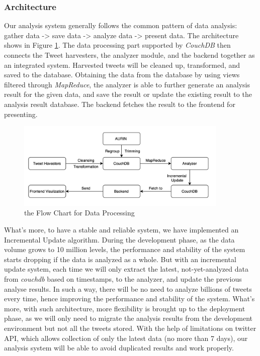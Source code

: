 \documentclass{article}
\begin{document}
\subsubsection{Architecture}
Our analysis system generally follows the common pattern of data analysis: gather data -> save data -> analyze data -> present data. The architecture shows in Figure
\ref{fig:data_process_architecture}. The data processing part supported by \textit{CouchDB} then connects the Tweet harvesters, the analyzer module, and the backend together as an integrated system. Harvested tweets will be cleaned up, transformed, and saved to the database. Obtaining the data from the database by using views filtered through \textit{MapReduce}, the analyzer is able to further generate an analysis result for the given data, and save the result or update the existing result to the analysis result database. The backend fetches the result to the frontend for presenting.
\begin{figure}[htp]
\centering
\includegraphics[width=0.9\textwidth]{img/3_2_1_data_processing.jpg}
\caption{the Flow Chart for Data Processing}
\label{fig:data_process_architecture}
\end{figure}

What’s more, to have a stable and reliable system, we have implemented an Incremental Update algorithm. During the development phase, as the data volume grows to 10 million levels, the performance and stability of the system starts dropping if the data is analyzed as a whole. But with an incremental update system, each time we will only extract the latest, not-yet-analyzed data from \textit{couchdb} based on timestamps, to the analyzer, and update the previous analyse results. In such a way, there will be no need to analyze billions of tweets every time, hence improving the performance and stability of the system. What’s more, with such architecture, more flexibility is brought up to the deployment phase, as we will only need to migrate the analysis results from the development environment but not all the tweets stored. With the help of limitations on twitter API, which allows collection of only the latest data (no more than 7 days), our analysis system will be able to avoid duplicated results and work properly.
\end{document}
